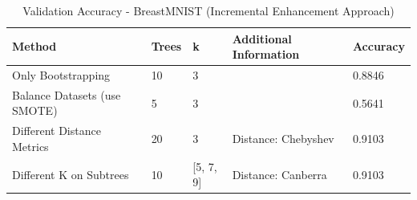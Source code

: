 \documentclass[a4paper]{article}
\begin{document}
\begin{table}[ht]
  \caption{Validation Accuracy - BreastMNIST (Incremental Enhancement Approach)}
  \label{tab:v_accuracy_incremental}
  \centering
  \begin{tabular}{lllll}
    \toprule
    Method & Trees & k & Additional Information & Accuracy \\
    \midrule
    Only Bootstrapping & 10 & 3 & & 0.8846 \\
    Balance Datasets (use SMOTE) & 5 & 3 & & 0.5641 \\
    Different Distance Metrics & 20 & 3 & Distance: Chebyshev & 0.9103 \\
    Different K on Subtrees & 10 & [5, 7, 9] & Distance: Canberra & 0.9103 \\
    \bottomrule
  \end{tabular}
\end{table}
\end{document}
